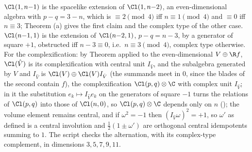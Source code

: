 $\Cl(1,n{-}1)$ is the spacelike extension of $\Cl(1,n{-}2)$, an even-dimensional algebra with $p - q = 3 - n$, which is $\equiv 2 \pmod 4$ iff $n \equiv 1 \pmod 4$ and $\equiv 0$ iff $n \equiv 3$; Theorem (a) gives the first claim and the complex type of the other case. $\Cl(n{-}1,1)$ is the extension of $\Cl(n{-}2,1)$, $p - q = n - 3$, by a generator of square $+1$, obstructed iff $n - 3 \equiv 0$, i.e.\ $n \equiv 3 \pmod 4$, complex type otherwise. For the complexification: by Theorem  applied to the even-dimensional $V \oplus \R f$, $\Cl(\hat V)$ is its complexification with central unit $I_{\hat V}$, and the subalgebra generated by $V$ and $I_{\hat V}$ is $\Cl(V) \oplus \Cl(V)I_{\hat V}$ (the summands meet in $0$, since the blades of the second contain $f$), the complexification $\Cl(p,q) \otimes \C$ with complex unit $I_{\hat V}$; in it the substitution $e_k \mapsto I_{\hat V}e_k$ on the generators of square $-1$ turns the relations of $\Cl(p,q)$ into those of $\Cl(n,0)$, so $\Cl(p,q) \otimes \C$ depends only on $n$ (); the volume element remains central, and if $\omega^2 = -1$ then $(I_{\hat V}\omega)^2 = +1$, so $\omega'$ as defined is a central involution and $\tfrac12(1 \pm \omega')$ are orthogonal central idempotents summing to $1$. The script checks the alternation, with its complex-type complement, in dimensions $3, 5, 7, 9, 11$.
